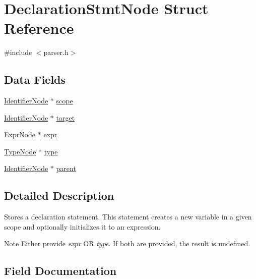 \hypertarget{struct_declaration_stmt_node}{}\section{Declaration\+Stmt\+Node Struct Reference}
\label{struct_declaration_stmt_node}


{\ttfamily \#include $<$parser.\+h$>$}

\subsection*{Data Fields}
\begin{DoxyCompactItemize}
\item 
\hyperlink{parser_8h_a930727769b8a8eb0d24d474f3aa12a43}{Identifier\+Node} $\ast$ \hyperlink{struct_declaration_stmt_node_ab52e3859c15ef8b651f330bcd963c56c}{scope}
\item 
\hyperlink{parser_8h_a930727769b8a8eb0d24d474f3aa12a43}{Identifier\+Node} $\ast$ \hyperlink{struct_declaration_stmt_node_a6fed156d07803ffd41487e873bcef98f}{target}
\item 
\hyperlink{struct_expr_node}{Expr\+Node} $\ast$ \hyperlink{struct_declaration_stmt_node_aba3f89fdd66c4b0264490aa639a6bd6f}{expr}
\item 
\hyperlink{struct_type_node}{Type\+Node} $\ast$ \hyperlink{struct_declaration_stmt_node_ac3e465107333db72e1f87a6cc0f41a68}{type}
\item 
\hyperlink{parser_8h_a930727769b8a8eb0d24d474f3aa12a43}{Identifier\+Node} $\ast$ \hyperlink{struct_declaration_stmt_node_aae96000b3961b3d34a1eac8034ae16bc}{parent}
\end{DoxyCompactItemize}


\subsection{Detailed Description}
Stores a declaration statement. This statement creates a new variable in a given scope and optionally initializes it to an expression.

\begin{DoxyNote}{Note}
Either provide {\itshape expr} OR {\itshape type}. If both are provided, the result is undefined. 
\end{DoxyNote}


\subsection{Field Documentation}
\mbox{\label{struct_declaration_stmt_node_ab52e3859c15ef8b651f330bcd963c56c}} 
